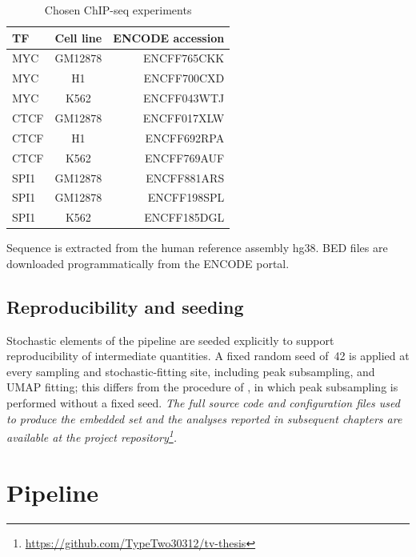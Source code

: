 \begin{table}[h!]
  \begin{center}
    \caption{Chosen ChIP-seq experiments}
    \label{tab:table1}
    \begin{tabular}{l|c|r} %
      \textbf{TF} & \textbf{Cell line} & \textbf{ENCODE accession}\\
      \hline
      MYC & GM12878 & ENCFF765CKK\\
      MYC & H1 & ENCFF700CXD\\
      MYC & K562 & ENCFF043WTJ\\
      CTCF & GM12878 & ENCFF017XLW\\
      CTCF & H1 & ENCFF692RPA\\
      CTCF & K562 & ENCFF769AUF\\
      SPI1 & GM12878 & ENCFF881ARS\\
      SPI1 & GM12878 & ENCFF198SPL\\
      SPI1 & K562 & ENCFF185DGL\\
    \end{tabular}
  \end{center}
\end{table}
Sequence is extracted from the human reference assembly hg38.
BED files are downloaded programmatically from the ENCODE portal.

\subsection{Reproducibility and seeding}

Stochastic elements of the pipeline are seeded explicitly to support reproducibility of intermediate quantities.
A fixed random seed of~42 is applied at every sampling and stochastic-fitting site, including peak subsampling, and UMAP fitting; this differs from the procedure of \citet{faltejskovaNonconsensusFlankingSequence2026a}, in which peak subsampling is performed without a fixed seed.
\emph{The full source code and configuration files used to produce the embedded set and the analyses reported in subsequent chapters are available at the project repository\footnote{\url{https://github.com/TypeTwo30312/tv-thesis}}.} %

\section{Pipeline}

